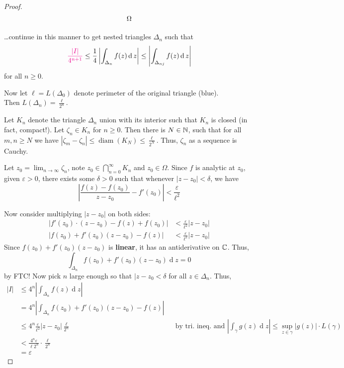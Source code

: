 \documentclass[12pt]{article}
\renewcommand{\d}{\ensuremath{\operatorname{d}}}
\begin{document}
\begin{proof}
\[\begin{tikzpicture}[x=0.75pt,y=0.75pt,yscale=-1,xscale=1]
        \draw (74,97.4) node [anchor=north west][inner sep=0.75pt]    {$\Omega $};
        
        
        \end{tikzpicture}        
        \]

    \dots continue in this manner to get nested triangles $\Delta_n$ such that \[\rt{\frac{|I|}{4^{n+1}}}\leq \frac{1}{4}\left|\int_{\Delta_n}f(z)\d z\right|\leq \left|\int_{\Delta_{nj}}f(z)\d z\right|\] for all $n\geq 0$.

    Now let $\ell=L(\Delta_0)$ denote perimeter of the original triangle (blue).\\ Then $L(\Delta_n)=\frac{\ell}{2^n}$. 

    Let $K_n$ denote the triangle $\Delta_n$ union with its interior such that $K_n$ is closed (in fact, compact!). Let $\zeta_n\in K_n$ for $n\geq 0$. Then there is $N\in \mathbb{N}$, such that for all $m,n\geq N$ we have $|\zeta_m-\zeta_n|\leq \operatorname{diam}(K_N)\leq \frac{\ell}{2^N}$. Thus, $\zeta_n$ as a sequence is Cauchy.

    Let $z_0=\lim_{n\to\infty}\zeta_n$, note $z_0\in \bigcap_{n=0}^{\infty} K_n$ and $z_0\in \Omega$. Since $f$ is analytic at $z_0$, given $\varepsilon>0$, there exists some $\delta>0$ such that whenever $|z-z_0|<\delta$, we have \[\left|\frac{f(z)-f(z_0)}{z-z_0}-f'(z_0)\right|<\frac{\varepsilon}{\ell^2}\]

    Now consider multiplying $|z-z_0|$ on both sides:
    \begin{align*}
        |f'(z_0)\cdot (z-z_0) - f(z) + f(z_0)| &< \frac{\varepsilon}{\ell^2} |z-z_0|\\
        |f(z_0) + f'(z_0)(z-z_0)-f(z)| &<\frac{\varepsilon}{\ell^2} |z-z_0|
    \end{align*}
    Since $f(z_0) + f'(z_0)(z-z_0)$ is \textbf{linear}, it has an antiderivative on $\mathbb{C}$. Thus, \[\int_{\Delta_n}f(z_0) + f'(z_0)(z-z_0)\d z = 0\]
    by FTC! Now pick $n$ large enough so that $|z-z_0<\delta$ for all $z\in \Delta_n$. Thus, \begin{align*}
        |I|&\leq 4^n \left|\int_{\Delta_n}f(z)\d z\right|\\ 
        &= 4^n\left|\int_{\Delta_n}f(z_0) + f'(z_0)(z-z_0)-f(z)\right|\\
        &\leq 4^n\frac{\varepsilon}{\ell^2}|z-z_0|\frac{\ell}{2^n} &&\text{by tri. ineq. and }\left|\int_\gamma g(z)\d z\right|\leq \sup_{z\in \gamma}|g(z)|\cdot L(\gamma)\\
        &< \frac{4^n\varepsilon}{\ell 2^n}\cdot \frac{\ell}{2^n}\\
        &= \varepsilon
    \end{align*}

   
\end{proof}
\end{document}
